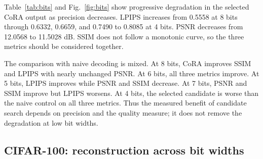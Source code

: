 \documentclass[10pt,twocolumn]{article}
\newcommand{\cora}{CoRA}
\begin{document}
Table~\ref{tab:bits} and Fig.~\ref{fig:bits} show progressive degradation
in the selected \cora{} output as precision decreases. LPIPS increases
from 0.5558 at 8 bits through 0.6332, 0.6659, and 0.7490 to 0.8085 at
4 bits. PSNR decreases from 12.0568 to 11.5028 dB. SSIM does not follow
a monotonic curve, so the three metrics should be considered together.

The comparison with naive decoding is mixed. At 8 bits, \cora{} improves
SSIM and LPIPS with nearly unchanged PSNR. At 6 bits, all three metrics
improve. At 5 bits, LPIPS improves while PSNR and SSIM decrease. At
7 bits, PSNR and SSIM improve but LPIPS worsens. At 4 bits, the selected
candidate is worse than the naive control on all three metrics. Thus
the measured benefit of candidate search depends on precision and the
quality measure; it does not remove the degradation at low bit widths.

\subsection{CIFAR-100: reconstruction across bit widths}
\label{sec:cifar100}
\noindent{}
\end{document}
